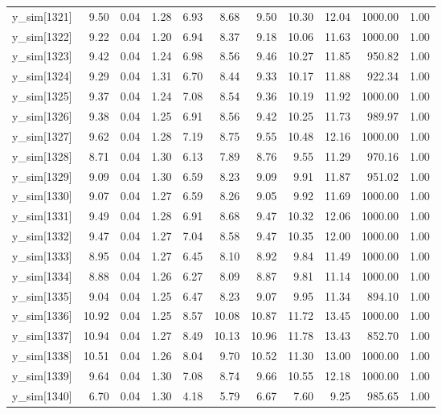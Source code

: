 \begin{table}[ht]
\begin{tabular}{rrrrrrrrrrr}
  y\_sim[1321] & 9.50 & 0.04 & 1.28 & 6.93 & 8.68 & 9.50 & 10.30 & 12.04 & 1000.00 & 1.00 \\ 
  y\_sim[1322] & 9.22 & 0.04 & 1.20 & 6.94 & 8.37 & 9.18 & 10.06 & 11.63 & 1000.00 & 1.00 \\ 
  y\_sim[1323] & 9.42 & 0.04 & 1.24 & 6.98 & 8.56 & 9.46 & 10.27 & 11.85 & 950.82 & 1.00 \\ 
  y\_sim[1324] & 9.29 & 0.04 & 1.31 & 6.70 & 8.44 & 9.33 & 10.17 & 11.88 & 922.34 & 1.00 \\ 
  y\_sim[1325] & 9.37 & 0.04 & 1.24 & 7.08 & 8.54 & 9.36 & 10.19 & 11.92 & 1000.00 & 1.00 \\ 
  y\_sim[1326] & 9.38 & 0.04 & 1.25 & 6.91 & 8.56 & 9.42 & 10.25 & 11.73 & 989.97 & 1.00 \\ 
  y\_sim[1327] & 9.62 & 0.04 & 1.28 & 7.19 & 8.75 & 9.55 & 10.48 & 12.16 & 1000.00 & 1.00 \\ 
  y\_sim[1328] & 8.71 & 0.04 & 1.30 & 6.13 & 7.89 & 8.76 & 9.55 & 11.29 & 970.16 & 1.00 \\ 
  y\_sim[1329] & 9.09 & 0.04 & 1.30 & 6.59 & 8.23 & 9.09 & 9.91 & 11.87 & 951.02 & 1.00 \\ 
  y\_sim[1330] & 9.07 & 0.04 & 1.27 & 6.59 & 8.26 & 9.05 & 9.92 & 11.69 & 1000.00 & 1.00 \\ 
  y\_sim[1331] & 9.49 & 0.04 & 1.28 & 6.91 & 8.68 & 9.47 & 10.32 & 12.06 & 1000.00 & 1.00 \\ 
  y\_sim[1332] & 9.47 & 0.04 & 1.27 & 7.04 & 8.58 & 9.47 & 10.35 & 12.00 & 1000.00 & 1.00 \\ 
  y\_sim[1333] & 8.95 & 0.04 & 1.27 & 6.45 & 8.10 & 8.92 & 9.84 & 11.49 & 1000.00 & 1.00 \\ 
  y\_sim[1334] & 8.88 & 0.04 & 1.26 & 6.27 & 8.09 & 8.87 & 9.81 & 11.14 & 1000.00 & 1.00 \\ 
  y\_sim[1335] & 9.04 & 0.04 & 1.25 & 6.47 & 8.23 & 9.07 & 9.95 & 11.34 & 894.10 & 1.00 \\ 
  y\_sim[1336] & 10.92 & 0.04 & 1.25 & 8.57 & 10.08 & 10.87 & 11.72 & 13.45 & 1000.00 & 1.00 \\ 
  y\_sim[1337] & 10.94 & 0.04 & 1.27 & 8.49 & 10.13 & 10.96 & 11.78 & 13.43 & 852.70 & 1.00 \\ 
  y\_sim[1338] & 10.51 & 0.04 & 1.26 & 8.04 & 9.70 & 10.52 & 11.30 & 13.00 & 1000.00 & 1.00 \\ 
  y\_sim[1339] & 9.64 & 0.04 & 1.30 & 7.08 & 8.74 & 9.66 & 10.55 & 12.18 & 1000.00 & 1.00 \\ 
  y\_sim[1340] & 6.70 & 0.04 & 1.30 & 4.18 & 5.79 & 6.67 & 7.60 & 9.25 & 985.65 & 1.00 \\ 

\end{tabular}
\end{table}
